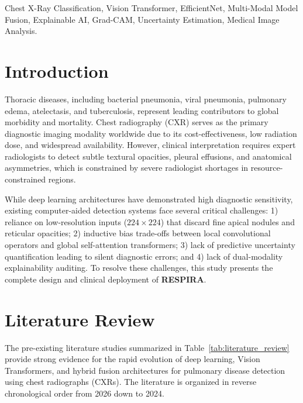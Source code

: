 \documentclass[journal]{IEEEtran}
\begin{document}
\begin{IEEEkeywords}
Chest X-Ray Classification, Vision Transformer, EfficientNet, Multi-Modal Model Fusion, Explainable AI, Grad-CAM, Uncertainty Estimation, Medical Image Analysis.
\end{IEEEkeywords}

\section{Introduction}
\label{sec:introduction}
Thoracic diseases, including bacterial pneumonia, viral pneumonia, pulmonary edema, atelectasis, and tuberculosis, represent leading contributors to global morbidity and mortality. Chest radiography (CXR) serves as the primary diagnostic imaging modality worldwide due to its cost-effectiveness, low radiation dose, and widespread availability. However, clinical interpretation requires expert radiologists to detect subtle textural opacities, pleural effusions, and anatomical asymmetries, which is constrained by severe radiologist shortages in resource-constrained regions.

While deep learning architectures have demonstrated high diagnostic sensitivity, existing computer-aided detection systems face several critical challenges: 1) reliance on low-resolution inputs ($224 \times 224$) that discard fine apical nodules and reticular opacities; 2) inductive bias trade-offs between local convolutional operators and global self-attention transformers; 3) lack of predictive uncertainty quantification leading to silent diagnostic errors; and 4) lack of dual-modality explainability auditing. To resolve these challenges, this study presents the complete design and clinical deployment of \textbf{RESPIRA}.

\section{Literature Review}
\label{sec:literature_review}

The pre-existing literature studies summarized in Table~\ref{tab:literature_review} provide strong evidence for the rapid evolution of deep learning, Vision Transformers, and hybrid fusion architectures for pulmonary disease detection using chest radiographs (CXRs). The literature is organized in reverse chronological order from 2026 down to 2024.
\end{document}
